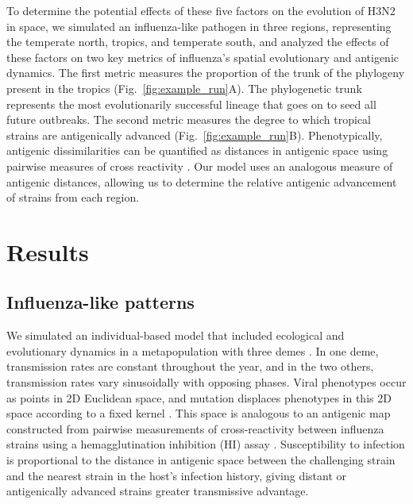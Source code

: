 \documentclass[10pt]{article}
\begin{document}
To determine the potential effects of these five factors on the evolution of H3N2 in space, we simulated an influenza-like pathogen in three regions, representing the temperate north, tropics, and temperate south, and analyzed the effects of these factors on two key metrics of influenza's spatial evolutionary and antigenic dynamics.
The first metric measures the proportion of the trunk of the phylogeny present in the tropics (Fig.~\ref{fig:example_run}A).
The phylogenetic trunk represents the most evolutionarily successful lineage that goes on to seed all future outbreaks.
The second metric measures the degree to which tropical strains are antigenically advanced (Fig.~\ref{fig:example_run}B).
Phenotypically, antigenic dissimilarities can be quantified as distances in antigenic space using pairwise measures of cross reactivity \cite{Smith:2004jc, Bedford:2014bf}.
Our model uses an analogous measure of antigenic distances, allowing us to determine the relative antigenic advancement of strains from each region.

\section{Results}
\subsection{Influenza-like patterns}
We simulated an individual-based model that included ecological and evolutionary dynamics in a metapopulation with three demes \cite{Bedford:2012bx}. 
In one deme, transmission rates are constant throughout the year, and in the two others, transmission rates vary sinusoidally with opposing phases.
Viral phenotypes occur as points in 2D Euclidean space, and mutation displaces phenotypes in this 2D space according to a fixed kernel \cite{Bedford:2012bx}.
This space is analogous to an antigenic map constructed from pairwise measurements of cross-reactivity between influenza strains using a hemagglutination inhibition (HI) assay \cite{Smith:2004jc, Bedford:2014bf}.
Susceptibility to infection is proportional to the distance in antigenic space between the challenging strain and the nearest strain in the host's infection history, giving distant or antigenically advanced strains greater transmissive advantage.
\end{document}
